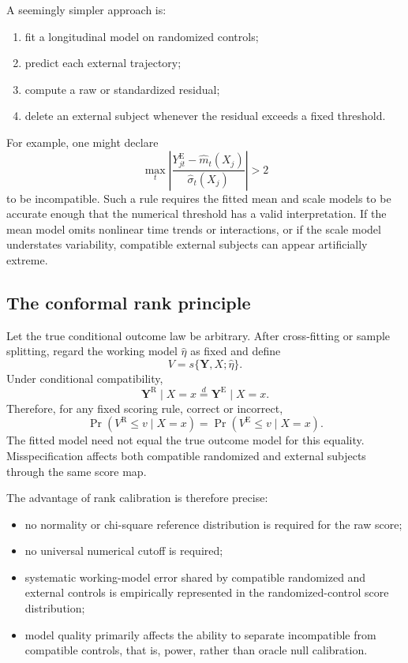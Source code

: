 \documentclass[11pt]{article}
\newcommand{\R}{\mathrm{R}}
\newcommand{\E}{\mathrm{E}}
\begin{document}
A seemingly simpler approach is:
\begin{enumerate}
    \item fit a longitudinal model on randomized controls;
    \item predict each external trajectory;
    \item compute a raw or standardized residual;
    \item delete an external subject whenever the residual exceeds a fixed threshold.
\end{enumerate}

For example, one might declare
\[
\max_t\left|
\frac{Y_{jt}^{\E}-\widehat m_t(X_j)}{\widehat\sigma_t(X_j)}
\right|>2
\]
to be incompatible. Such a rule requires the fitted mean and scale models to be accurate enough that the numerical threshold has a valid interpretation. If the mean model omits nonlinear time trends or interactions, or if the scale model understates variability, compatible external subjects can appear artificially extreme.

\subsection{The conformal rank principle}

Let the true conditional outcome law be arbitrary. After cross-fitting or sample splitting, regard the working model $\widehat\eta$ as fixed and define
\[
V=s\{\bm Y,X;\widehat\eta\}.
\]
Under conditional compatibility,
\[
\bm Y^{\R}\mid X=x
\overset d=
\bm Y^{\E}\mid X=x.
\]
Therefore, for any fixed scoring rule, correct or incorrect,
\[
\Pr(V^{\R}\le v\mid X=x)
=
\Pr(V^{\E}\le v\mid X=x).
\tag{2}
\]
The fitted model need not equal the true outcome model for this equality. Misspecification affects both compatible randomized and external subjects through the same score map.

The advantage of rank calibration is therefore precise:
\begin{itemize}
    \item no normality or chi-square reference distribution is required for the raw score;
    \item no universal numerical cutoff is required;
    \item systematic working-model error shared by compatible randomized and external controls is empirically represented in the randomized-control score distribution;
    \item model quality primarily affects the ability to separate incompatible from compatible controls, that is, power, rather than oracle null calibration.
\end{itemize}
\end{document}
